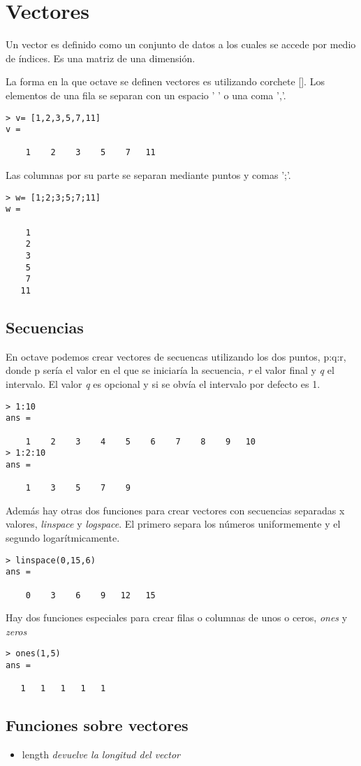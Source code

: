 \documentclass[a4,12pt,graphicx,caption,rotating]{article}
\begin{document}
\section{Vectores}
Un vector es definido como un conjunto de datos a los cuales se accede por medio de índices. Es una matriz de una dimensión.

La forma en la que octave se definen vectores es utilizando corchete []. Los elementos de una fila se separan con un espacio ' ' o una coma ','.
\begin{verbatim}
> v= [1,2,3,5,7,11]
v =

    1    2    3    5    7   11
\end{verbatim}
Las columnas por su parte se separan mediante puntos y comas ';'.
\begin{verbatim}
> w= [1;2;3;5;7;11]
w =

    1
    2
    3
    5
    7
   11
\end{verbatim}
\subsection{Secuencias}
En octave podemos crear vectores de secuencas utilizando los dos puntos, p:q:r, donde p sería el valor en el que se iniciaría la secuencia, \emph{r} el valor final y \emph{q} el intervalo. El valor \emph{q} es opcional y si se obvía el intervalo por defecto es 1.
\begin{verbatim}
> 1:10
ans =

    1    2    3    4    5    6    7    8    9   10
> 1:2:10
ans =

    1    3    5    7    9
\end{verbatim}
Además hay otras dos funciones para crear vectores con secuencias separadas x valores, \emph{linspace} y \emph{logspace}. El primero separa los números uniformemente y el segundo logarítmicamente.
\begin{verbatim}
> linspace(0,15,6)
ans =

    0    3    6    9   12   15
\end{verbatim}
Hay dos funciones especiales para crear filas o columnas de unos o ceros, \emph{ones} y \emph{zeros}
\begin{verbatim}
> ones(1,5)
ans =

   1   1   1   1   1
\end{verbatim}
\subsection{Funciones sobre vectores}
\begin{itemize}
\item length \emph{devuelve la longitud del vector}
\end{itemize}
\end{document}
